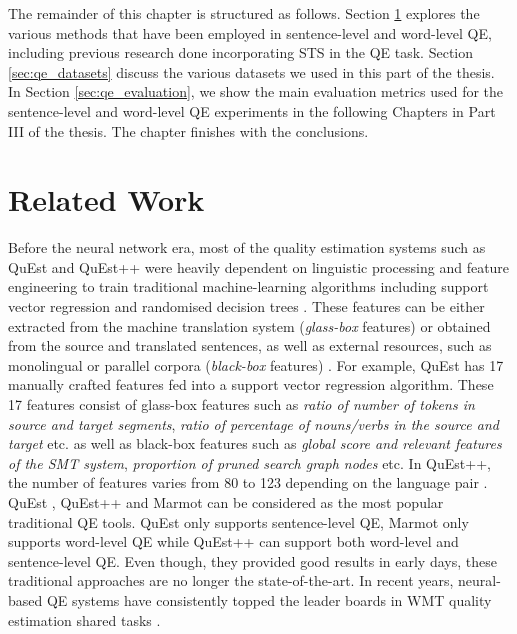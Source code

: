 The remainder of this chapter is structured as follows. Section \ref{sec:qe_related} explores the various methods that have been employed in sentence-level and word-level QE, including previous research done incorporating STS in the QE task. Section \ref{sec:qe_datasets} discuss the various datasets we used in this part of the thesis. In Section \ref{sec:qe_evaluation}, we show the main evaluation metrics used for the sentence-level and word-level QE experiments in the following Chapters in Part III of the thesis. The chapter finishes with the conclusions.



\section{Related Work}
\label{sec:qe_related}
Before the neural network era, most of the quality estimation systems such as QuEst \autocite{specia-etal-2013-quest} and QuEst++ \autocite{specia-etal-2015-multi} were heavily dependent on linguistic processing and feature engineering to train traditional machine-learning algorithms including support vector regression and randomised decision trees \autocite{specia-etal-2013-quest}. These features can be either extracted from the machine translation system (\textit{glass-box} features) or obtained from
the source and translated sentences, as well as external resources, such as monolingual or parallel corpora (\textit{black-box} features) \autocite{specia-etal-2009-estimating}. For example, QuEst \autocite{specia-etal-2013-quest} has 17 manually crafted features fed into a support vector regression algorithm. These 17 features consist of glass-box features such as \textit{ratio of number of tokens in source and target segments}, \textit{ratio of percentage of nouns/verbs in the source and target} etc. as well as black-box features such as \textit{global score and relevant features of the SMT system}, \textit{proportion of pruned search graph nodes} etc. In QuEst++, the number of features varies from 80 to 123 depending on the language pair \autocite{specia-etal-2015-multi}. QuEst \autocite{specia-etal-2013-quest}, QuEst++ \autocite{specia-etal-2015-multi} and Marmot \autocite{logacheva-etal-2016-marmot} can be considered as the most popular traditional QE tools. QuEst \autocite{specia-etal-2013-quest} only supports sentence-level QE, Marmot \autocite{logacheva-etal-2016-marmot} only supports word-level QE while QuEst++ \autocite{specia-etal-2015-multi} can support both word-level and sentence-level QE. Even though, they provided good results in early days, these traditional approaches are no longer the state-of-the-art. In recent years, neural-based QE systems have consistently topped the leader boards in WMT quality estimation shared tasks  \autocite{kepler-etal-2019-openkiwi}.  

